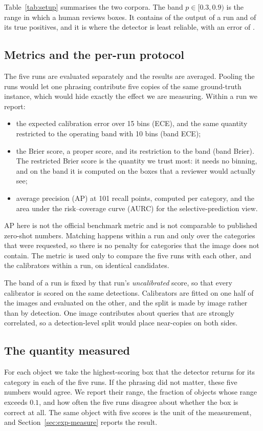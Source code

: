 Table~\ref{tab:setup} summarises the two corpora. The band $p\in[0.3,0.9)$ is the range in
which a human reviews boxes. It contains \BANDFRAC{} of the output of a run and \BANDPOS{} of
its true positives, and it is where the detector is least reliable, with an error of
\BANDIDN.



\subsection{Metrics and the per-run protocol}

The five runs are evaluated separately and the results are averaged. Pooling the runs would let
one phrasing contribute five copies of the same ground-truth instance, which would hide exactly
the effect we are measuring. Within a run we report:

\begin{itemize}
\item the expected calibration error over 15 bins (ECE), and the same quantity restricted to the
operating band with 10 bins (band ECE);
\item the Brier score, a proper score, and its restriction to the band (band Brier). The
restricted Brier score is the quantity we trust most: it needs no binning, and on the band it is
computed on the boxes that a reviewer would actually see;
\item average precision (AP) at 101 recall points, computed per category, and the area under the
risk--coverage curve (AURC) for the selective-prediction view.
\end{itemize}

AP here is not the official benchmark metric and is not comparable to published zero-shot
numbers. Matching happens within a run and only over the categories that were requested, so
there is no penalty for categories that the image does not contain. The metric is used only to
compare the five runs with each other, and the calibrators within a run, on identical
candidates.

The band of a run is fixed by that run's \emph{uncalibrated} score, so that every calibrator is
scored on the same detections. Calibrators are fitted on one half of the images and evaluated on
the other, and the split is made by image rather than by detection. One image contributes about
\DETPERIMG{} queries that are strongly correlated, so a detection-level split would place
near-copies on both sides.

\subsection{The quantity measured}

For each object we take the highest-scoring box that the detector returns for its category in
each of the five runs. If the phrasing did not matter, these five numbers would agree. We report
their range, the fraction of objects whose range exceeds $0.1$, and how often the five runs
disagree about whether the box is correct at all. The same object with five scores is the unit
of the measurement, and Section~\ref{sec:exp-measure} reports the result.

